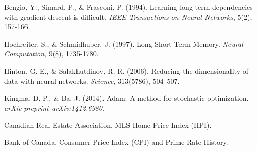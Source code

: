 \begin{thebibliography}{}

Bengio, Y., Simard, P., \& Frasconi, P. (1994). Learning long-term dependencies with gradient descent is difficult. \textit{IEEE Transactions on Neural Networks}, 5(2), 157-166.


Hochreiter, S., \& Schmidhuber, J. (1997). Long Short-Term Memory. \textit{Neural Computation}, 9(8), 1735-1780.


Hinton, G. E., \& Salakhutdinov, R. R. (2006). Reducing the dimensionality of data with neural networks. \textit{Science}, 313(5786), 504–507.

Kingma, D. P., \& Ba, J. (2014). Adam: A method for stochastic optimization. \textit{arXiv preprint arXiv:1412.6980}.


Canadian Real Estate Association. MLS Home Price Index (HPI). 


Bank of Canada. Consumer Price Index (CPI) and Prime Rate History.

\end{thebibliography}